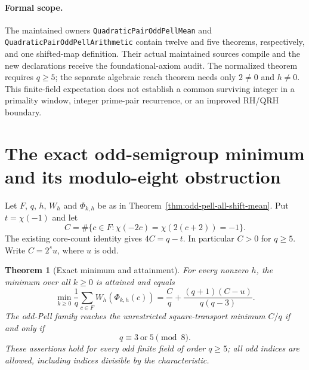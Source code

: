 \documentclass[11pt]{article}
\newtheorem{theorem}{Theorem}[section]
\begin{document}
\paragraph{Formal scope.}
The maintained owners
\texttt{QuadraticPairOddPellMean} and
\texttt{QuadraticPairOddPellArithmetic} contain twelve and five
theorems, respectively, and one shifted-map definition.
Their actual maintained sources compile and the new declarations
receive the foundational-axiom audit. The normalized theorem
requires \(q\ge5\); the separate algebraic reach theorem needs only
\(2\ne0\) and \(h\ne0\).
This finite-field expectation does not establish a common
surviving integer in a primality window, integer prime-pair
recurrence, or an improved RH/QRH boundary.


\section{The exact odd-semigroup minimum and its modulo-eight obstruction}
\label{sec:odd-pell-minimum}

Let \(F\), \(q\), \(h\), \(W_h\) and \(\Phi_{k,h}\) be as in
Theorem~\ref{thm:odd-pell-all-shift-mean}. Put \(t=\chi(-1)\) and let
\[
 C=\#\{c\in F:\chi(-2c)=\chi(2(c+2))=-1\}.
\]
The existing core-count identity gives \(4C=q-t\). In particular
\(C>0\) for \(q\ge5\). Write \(C=2^s u\), where \(u\) is odd.

\begin{theorem}[Exact minimum and attainment]\label{thm:odd-pell-minimum}
For every nonzero \(h\), the minimum over all \(k\ge0\) is attained
and equals
\[
 \boxed{\quad
 \min_{k\ge0}\frac1q\sum_{c\in F}W_h(\Phi_{k,h}(c))
   =\frac Cq+\frac{(q+1)(C-u)}{q(q-3)}.\quad}
\]
The odd-Pell family reaches the unrestricted square-transport
minimum \(C/q\) if and only if
\[
                     q\equiv3\ \text{or}\ 5\pmod8.
\]
These assertions hold for every odd finite field of order \(q\ge5\);
all odd indices are allowed, including indices divisible by the
characteristic.
\end{theorem}
\end{document}
